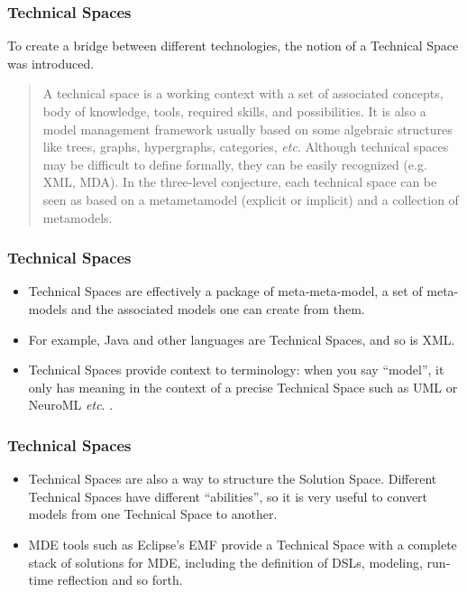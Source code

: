 \documentclass{beamer}
\newcommand{\etc}{\textit{etc}. }
\begin{document}
\begin{frame}
\frametitle{Technical Spaces}

To create a bridge between different technologies, the notion of a
Technical Space was introduced\cite{kurtev2002technological}.

\begin{quote}
A technical space is a working context with a set of associated
concepts, body of knowledge, tools, required skills, and
possibilities. It is also a model management framework usually based
on some algebraic structures like trees, graphs, hypergraphs,
categories, \etc Although technical spaces may be difficult to define
formally, they can be easily recognized (e.g. XML, MDA). In the
three-level conjecture, each technical space can be seen as based on a
metametamodel (explicit or implicit) and a collection of metamodels.
\end{quote}

\end{frame}

\begin{frame}
\frametitle{Technical Spaces}

\begin{itemize}
\item Technical Spaces are effectively a package of meta-meta-model, a
  set of meta-models and the associated models one can create from
  them.
  \pause
\item For example, Java and other languages are Technical Spaces,
  and so is XML.
  \pause
\item Technical Spaces provide context to terminology: when you say
  ``model'', it only has meaning in the context of a precise
  Technical Space such as UML or NeuroML \etc.
\end{itemize}

\end{frame}

\begin{frame}
\frametitle{Technical Spaces}

\begin{itemize}
\item Technical Spaces are also a way to structure the Solution
  Space. Different Technical Spaces have different ``abilities'', so
  it is very useful to convert models from one Technical Space to
  another.
  \pause
\item MDE tools such as Eclipse's EMF provide a Technical Space with
  a complete stack of solutions for MDE, including the definition of
  DSLs, modeling, run-time reflection and so forth.
\end{itemize}

\end{frame}
\end{document}
